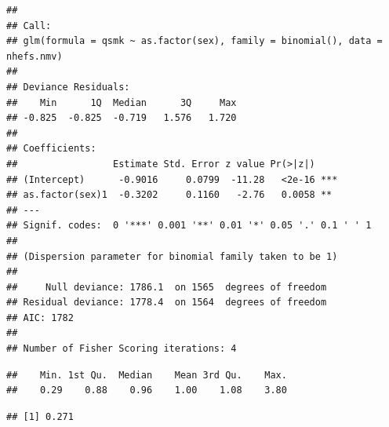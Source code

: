 \documentclass[
  10pt,
]{book}
\newenvironment{Shaded}{\begin{snugshade}}{\end{snugshade}}
\newcommand{\DataTypeTok}[1]{\textcolor[rgb]{0.13,0.29,0.53}{#1}}
\newcommand{\DecValTok}[1]{\textcolor[rgb]{0.00,0.00,0.81}{#1}}
\newcommand{\KeywordTok}[1]{\textcolor[rgb]{0.13,0.29,0.53}{\textbf{#1}}}
\newcommand{\NormalTok}[1]{#1}
\newcommand{\OperatorTok}[1]{\textcolor[rgb]{0.81,0.36,0.00}{\textbf{#1}}}
\newcommand{\StringTok}[1]{\textcolor[rgb]{0.31,0.60,0.02}{#1}}
\begin{document}
\begin{verbatim}
## 
## Call:
## glm(formula = qsmk ~ as.factor(sex), family = binomial(), data = nhefs.nmv)
## 
## Deviance Residuals: 
##    Min      1Q  Median      3Q     Max  
## -0.825  -0.825  -0.719   1.576   1.720  
## 
## Coefficients:
##                 Estimate Std. Error z value Pr(>|z|)    
## (Intercept)      -0.9016     0.0799  -11.28   <2e-16 ***
## as.factor(sex)1  -0.3202     0.1160   -2.76   0.0058 ** 
## ---
## Signif. codes:  0 '***' 0.001 '**' 0.01 '*' 0.05 '.' 0.1 ' ' 1
## 
## (Dispersion parameter for binomial family taken to be 1)
## 
##     Null deviance: 1786.1  on 1565  degrees of freedom
## Residual deviance: 1778.4  on 1564  degrees of freedom
## AIC: 1782
## 
## Number of Fisher Scoring iterations: 4
\end{verbatim}

\begin{Shaded}
\end{Shaded}

\begin{verbatim}
##    Min. 1st Qu.  Median    Mean 3rd Qu.    Max. 
##    0.29    0.88    0.96    1.00    1.08    3.80
\end{verbatim}

\begin{Shaded}
\end{Shaded}

\begin{verbatim}
## [1] 0.271
\end{verbatim}
\end{document}
